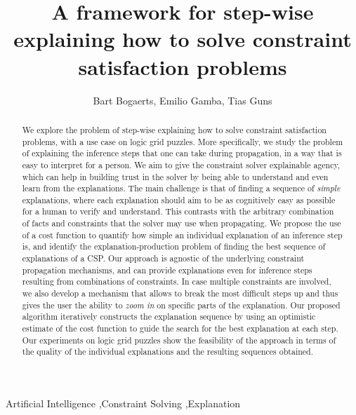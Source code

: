\documentclass[3p]{elsarticle}
\begin{document}
\tableofcontents
\newpage
\begin{frontmatter}

\title{A framework for step-wise explaining how to solve constraint satisfaction problems}

\author[mymainaddress]{Bart Bogaerts, Emilio Gamba, Tias Guns}
\address{Vrije Universiteit Brussel, Pleinlaan 2, 1050 Brussel, Belgium}

\begin{abstract}
We explore the problem of step-wise explaining how to solve constraint satisfaction problems, with a use case on logic grid puzzles.
More specifically, we study the problem of explaining the inference steps that one can take during propagation, in a way that is easy to interpret for a person.
We aim to give the constraint solver explainable agency, which can help in building trust in the solver by being able to understand and even learn from the explanations.
The main challenge is that of finding a sequence of \textit{simple} explanations, where each explanation should aim to be as cognitively easy as possible for a human to verify and understand. 
This contrasts with the arbitrary combination of facts and constraints that the solver may use when propagating.
We propose the use of a cost function to quantify how simple an individual explanation of an inference step is, and identify the explanation-production problem of finding the best sequence of explanations of a CSP. 
Our approach is agnostic of the underlying constraint propagation mechanisms, and can provide explanations even for inference steps resulting from combinations of constraints. 
In case multiple constraints are involved, we also develop a mechanism that allows to break the most difficult steps up and thus gives the user the ability to \emph{zoom in} on specific parts of the explanation. 
Our proposed algorithm iteratively constructs the explanation sequence by using an optimistic estimate of the cost function to guide the search for the best explanation at each step.
Our experiments on logic grid puzzles show the feasibility of the approach in terms of the quality of the individual explanations and the resulting sequences obtained.
\end{abstract}

\begin{keyword}
Artificial Intelligence \sep Constraint Solving \sep Explanation
\end{keyword}

\end{frontmatter}
\end{document}
